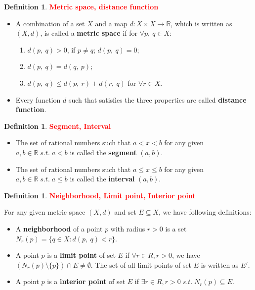 \documentclass[12pt,a4paper]{article}
\theoremstyle{definition}
\newtheorem{dfn}[thm]{Definition}
\begin{document}
\begin {dfn} \textcolor{RED}{\bf Metric space, distance function}
    \begin{itemize}
        \item A combination of a set $X$ and a map $d: X \times X \rightarrow \mathbb{R}$, which is written as $(X, d)$, is called a {\bf metric space} if for $\forall p,\:q\in X$:
        \begin{enumerate}
            \item $d(p,\:q) > 0$, if $p \neq q$; $d(p,\:q) = 0$;
            \item $d(p,\:q) = d(q,\:p)$;
            \item $d(p,\:q) \leq d(p,\:r) + d(r,\:q)$ for $\forall r \in X$.
        \end{enumerate}
        \item Every function $d$ such that satisfies the three properties are called {\bf distance function}.
    \end{itemize}
\end {dfn}

\begin {dfn} \textcolor{RED}{\bf Segment, Interval}
    \begin{itemize}
        \item The set of rational numbers such that $a < x < b$ for any given $a, b\in\mathbb{R}\;s.t.\;a < b$ is called the {\bf segment} $(a, b)$.
        \item The set of rational numbers such that $a \leq x \leq b$ for any given $a, b\in\mathbb{R}\;s.t.\;a \leq b$ is called the {\bf interval} $(a, b)$.
    \end{itemize}
\end {dfn}

\begin {dfn} \textcolor{RED}{\bf Neighborhood, Limit point, Interior point}
    \par For any given metric space $(X, d)$ and set $E \subseteq X$, we have following definitions:
    \begin{itemize}
        \item A {\bf neighborhood} of a point $p$ with radius $r>0$ is a set $N_{r}(p) = \{q \in X: d(p,\:q) < r\}$.
        \item A point $p$ is a {\bf limit point} of set $E$ if $\forall r \in R, r > 0$, we have $(N_{r}(p) \setminus \{p\}) \cap E \neq \emptyset$. The set of all limit points of set $E$ is written as $E'$.
        \item A point $p$ is a {\bf interior point} of set $E$ if $\exists r \in R, r > 0\;s.t.\;N_{r}(p) \subseteq E$. 
    \end{itemize}
\end {dfn}
\end{document}
